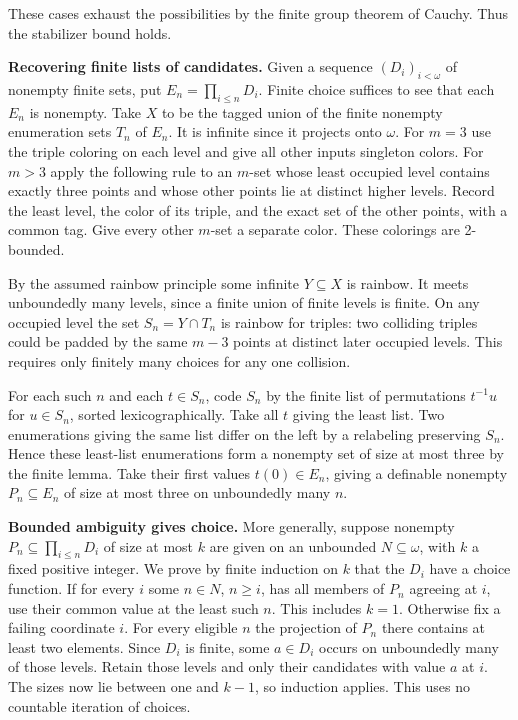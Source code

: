 \documentclass[11pt]{article}
\begin{document}
These cases exhaust the possibilities by the finite group theorem of Cauchy. Thus the stabilizer bound holds.

\textbf{Recovering finite lists of candidates.} Given a sequence \((D_i)_{i<\omega}\) of nonempty finite sets, put \(E_n=\prod_{i\le n}D_i\). Finite choice suffices to see that each \(E_n\) is nonempty. Take \(X\) to be the tagged union of the finite nonempty enumeration sets \(T_n\) of \(E_n\). It is infinite since it projects onto \(\omega\). For \(m=3\) use the triple coloring on each level and give all other inputs singleton colors. For \(m>3\) apply the following rule to an \(m\)-set whose least occupied level contains exactly three points and whose other points lie at distinct higher levels. Record the least level, the color of its triple, and the exact set of the other points, with a common tag. Give every other \(m\)-set a separate color. These colorings are 2-bounded.

By the assumed rainbow principle some infinite \(Y\subseteq X\) is rainbow. It meets unboundedly many levels, since a finite union of finite levels is finite. On any occupied level the set \(S_n=Y\cap T_n\) is rainbow for triples: two colliding triples could be padded by the same \(m-3\) points at distinct later occupied levels. This requires only finitely many choices for any one collision.

For each such \(n\) and each \(t\in S_n\), code \(S_n\) by the finite list of permutations \(t^{-1}u\) for \(u\in S_n\), sorted lexicographically. Take all \(t\) giving the least list. Two enumerations giving the same list differ on the left by a relabeling preserving \(S_n\). Hence these least-list enumerations form a nonempty set of size at most three by the finite lemma. Take their first values \(t(0)\in E_n\), giving a definable nonempty \(P_n\subseteq E_n\) of size at most three on unboundedly many \(n\).

\textbf{Bounded ambiguity gives choice.} More generally, suppose nonempty \(P_n\subseteq\prod_{i\le n}D_i\) of size at most \(k\) are given on an unbounded \(N\subseteq\omega\), with \(k\) a fixed positive integer. We prove by finite induction on \(k\) that the \(D_i\) have a choice function. If for every \(i\) some \(n\in N\), \(n\ge i\), has all members of \(P_n\) agreeing at \(i\), use their common value at the least such \(n\). This includes \(k=1\). Otherwise fix a failing coordinate \(i\). For every eligible \(n\) the projection of \(P_n\) there contains at least two elements. Since \(D_i\) is finite, some \(a\in D_i\) occurs on unboundedly many of those levels. Retain those levels and only their candidates with value \(a\) at \(i\). The sizes now lie between one and \(k-1\), so induction applies. This uses no countable iteration of choices.
\end{document}
